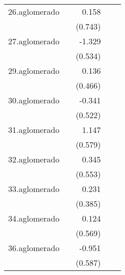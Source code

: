 {\begin{longtable}{l*{4}{D{.}{.}{-1}}}
\addlinespace
26.aglomerado&                     &       0.158         &                     &                     \\
            &                     &     (0.743)         &                     &                     \\
\addlinespace
27.aglomerado&                     &      -1.329\sym{*}  &                     &                     \\
            &                     &     (0.534)         &                     &                     \\
\addlinespace
29.aglomerado&                     &       0.136         &                     &                     \\
            &                     &     (0.466)         &                     &                     \\
\addlinespace
30.aglomerado&                     &      -0.341         &                     &                     \\
            &                     &     (0.522)         &                     &                     \\
\addlinespace
31.aglomerado&                     &       1.147\sym{*}  &                     &                     \\
            &                     &     (0.579)         &                     &                     \\
\addlinespace
32.aglomerado&                     &       0.345         &                     &                     \\
            &                     &     (0.553)         &                     &                     \\
\addlinespace
33.aglomerado&                     &       0.231         &                     &                     \\
            &                     &     (0.385)         &                     &                     \\
\addlinespace
34.aglomerado&                     &       0.124         &                     &                     \\
            &                     &     (0.569)         &                     &                     \\
\addlinespace
36.aglomerado&                     &      -0.951         &                     &                     \\
            &                     &     (0.587)         &                     &                     \\

\end{longtable}}
